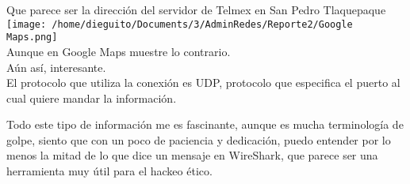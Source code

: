 \documentclass[]{article}
\begin{document}
Que parece ser la dirección del servidor de
Telmex en San Pedro Tlaquepaque\\

\texttt{[image: /home/dieguito/Documents/3/AdminRedes/Reporte2/Google Maps.png]}\\
Aunque en Google Maps muestre lo contrario.\\

Aún así, interesante.\\

El protocolo que utiliza la conexión es UDP, protocolo que especifica el puerto al cual quiere mandar la información.

Todo este tipo de información me es fascinante, aunque es mucha terminología de golpe, siento que con un poco de paciencia y dedicación, puedo entender por lo menos la mitad de lo que dice un mensaje en WireShark, que parece ser una herramienta muy útil para el hackeo ético.
\end{document}
